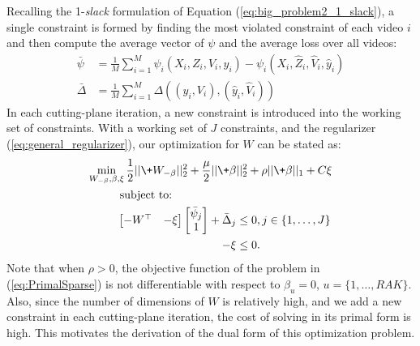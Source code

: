 Recalling the 1-\emph{slack} formulation of Equation (\ref{eq:big_problem2_1_slack}), a single constraint is formed by finding the most violated constraint of each video $i$ and then compute the average vector of $\psi$ and the average loss over all videos:
\begin{align}
\bar\psi & =  \frac{1}{M}\sum_{i=1}^M \psi_i(X_i,Z_i,V_i,y_i) - \psi_i(X_i,\hat Z_i, \hat V_i, \hat y_i) \\
\bar\Delta & = \frac{1}{M}\sum_{i=1}^M \Delta((y_i,V_i),(\hat y_i, \hat V_i))
\end{align}  
%
In each cutting-plane iteration, a new constraint is introduced into the working set of constraints.
With a working set of $J$ constraints, and the regularizer (\ref{eq:general_regularizer}), our optimization for $W$ can be stated as:
\begin{align}
\label{eq:PrimalSparse}
\begin{split}
\min_{W_{-\beta},\beta,\xi}  \frac{1}{2} ||\+W_{-\beta}||_2^2   + \frac{\mu}{2}||\+\beta & ||_2^2 + \rho ||\+\beta||_1 + C\xi \\
\text{subject to:}\hspace{2cm}\\
 \quad\quad\begin{bmatrix} -W^\top & -\xi \end{bmatrix}  \begin{bmatrix} \bar{\psi}_j \\ 1 \end{bmatrix} + \bar{\Delta}_j  & \le 0, j \in \{1,\dots,J\} \\
 -\xi &\le 0.
\end{split}
\end{align}
%
Note that when $\rho > 0$, the objective function of the problem in (\ref{eq:PrimalSparse})
is not differentiable with respect to $\beta_u = 0$, $u=\{1,\dots,RAK\}$. Also, since the number of dimensions of $W$ is relatively high, and we add a new constraint in each cutting-plane iteration, the cost of solving in its primal form is high.
This motivates the derivation of the dual form of this optimization problem.

